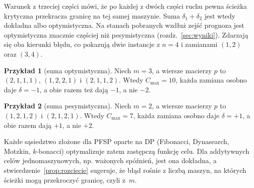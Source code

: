 \documentclass[letterpaper]{article} %
\theoremstyle{definition}
\newtheorem{example}{Przykład}
\begin{document}
Warunek z trzeciej części mówi, że po każdej z dwóch części ruchu
pewna ścieżka krytyczna przekracza granicę na tej samej maszynie. Suma $\delta_1+\delta_2$ jest wtedy dokładna albo optymistyczna. Na stanach pobranych wzdłuż zejść
prognoza jest optymistyczna znacznie częściej niż pesymistyczna
(rozdz.~\ref{sec:wyniki}). Zdarzają się oba kierunki błędu, co pokazują dwie instancje z $n=4$ i zamianami $(1,2)$ oraz
$(3,4)$.

\begin{example}[suma optymistyczna]
Niech $m=3$, a wiersze macierzy $p$ to $(2,1,1,1)$, $(1,2,2,1)$
i $(2,1,1,2)$. Wtedy $C_{\max}=10$, każda zamiana osobno daje
$\delta=-1$, a obie razem też dają $-1$, a nie $-2$.
\end{example}
\begin{example}[suma pesymistyczna]
Niech $m=2$, a wiersze macierzy $p$ to $(1,2,1,2)$ i $(2,1,2,1)$. Wtedy
$C_{\max}=7$, każda zamiana osobno daje $\delta=+1$, a obie razem dają
$+1$, a nie $+2$.
\end{example}

Każde sąsiedztwo złożone dla PFSP oparte na DP (Fibonacci, Dynasearch,
Motzkin, $k$-bonacci) optymalizuje zatem zastępczą funkcję celu. Dla
addytywnych celów jednomaszynowych, np. ważonych spóźnień, jest ona dokładna, a stwierdzenie~\ref{prop:rozciecie} sugeruje, że
błąd rośnie z liczbą maszyn, na których ścieżki mogą przekroczyć granicę,
czyli z~$m$.
\end{document}
